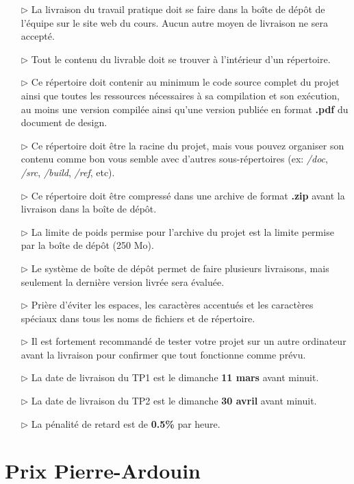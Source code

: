 \documentclass[12pt]{article}
\begin{document}
\begin{itemize}
\item[$\triangleright$]
La livraison du travail pratique doit se faire dans la boîte de dépôt de l'équipe sur le site web du cours. Aucun autre moyen de livraison ne sera accepté.
\item[$\triangleright$]
Tout le contenu du livrable doit se trouver à l'intérieur d'un répertoire.
\item[$\triangleright$]
Ce répertoire doit contenir au minimum le code source complet du projet ainsi que toutes les ressources nécessaires à sa compilation et son exécution, au moins une version compilée ainsi qu'une version publiée en format \textbf{.pdf} du document de design.
\item[$\triangleright$] Ce répertoire doit être la racine du projet, mais vous pouvez organiser son contenu comme bon vous semble avec d'autres sous-répertoires (ex: \textit{/doc}, \textit{/src}, \textit{/build}, \textit{/ref}, etc).
\item[$\triangleright$] Ce répertoire doit être compressé dans une archive de format \textbf{.zip} avant la livraison dans la boîte de dépôt.
\item[$\triangleright$]
La limite de poids permise pour l'archive du projet est la limite permise par la boîte de dépôt (250 Mo).
\item[$\triangleright$]
Le système de boîte de dépôt permet de faire plusieurs livraisons, mais seulement la dernière version livrée sera évaluée.
\item[$\triangleright$]
Prière d'éviter les espaces, les caractères accentués et les caractères spéciaux dans tous les noms de fichiers et de répertoire.
\item[$\triangleright$]
Il est fortement recommandé de tester votre projet sur un autre ordinateur avant la livraison pour confirmer que tout fonctionne comme prévu.
\item[$\triangleright$]
La date de livraison du TP1 est le dimanche \textbf{11 mars} avant minuit.
\item[$\triangleright$]
La date de livraison du TP2 est le dimanche \textbf{30 avril} avant minuit.
\item[$\triangleright$]
La pénalité de retard est de \textbf{0.5\%} par heure.
\end{itemize}

\pagebreak

\section*{Prix Pierre-Ardouin}
\end{document}
